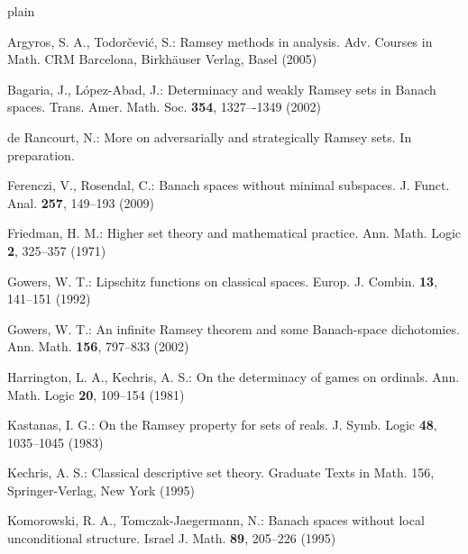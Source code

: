 \documentclass[a4paper,11pt]{article}
\theoremstyle{definition}
\numberwithin{equation}{section}
\begin{document}
\begin{thebibliography}{plain}




\normalsize


Argyros, S. A., Todor\v{c}evi\'c, S.:
Ramsey methods in analysis.
Adv. Courses in Math. CRM Barcelona, Birkh\"auser Verlag, Basel (2005)

Bagaria, J., L\'opez-Abad, J.: 
Determinacy and weakly {R}amsey sets in {B}anach spaces.
Trans. Amer. Math. Soc. \textbf{354}, 1327–-1349 (2002)

de Rancourt, N.:
More on adversarially and strategically {R}amsey sets.
In preparation.

Ferenczi, V., Rosendal, C.: 
{B}anach spaces without minimal subspaces.
J. Funct. Anal. \textbf{257}, 149--193 (2009)

Friedman, H. M.: 
Higher set theory and mathematical practice.
Ann. Math. Logic \textbf{2}, 325--357 (1971)

Gowers, W. T.: 
Lipschitz functions on classical spaces.
Europ. J. Combin. \textbf{13}, 141--151 (1992)

Gowers, W. T.: 
An infinite {R}amsey theorem and some {B}anach-space dichotomies.
Ann. Math. \textbf{156}, 797--833 (2002)

Harrington, L. A., Kechris, A. S.: 
On the determinacy of games on ordinals.
Ann. Math. Logic \textbf{20}, 109--154 (1981)

Kastanas, I. G.: 
On the {R}amsey property for sets of reals.
J. Symb. Logic \textbf{48}, 1035--1045 (1983)

Kechris, A. S.:
Classical descriptive set theory.
Graduate Texts in Math. 156, Springer-Verlag, New York (1995)

Komorowski, R. A., Tomczak-Jaegermann, N.: 
Banach spaces without local unconditional structure.
Israel J. Math. \textbf{89}, 205--226 (1995)


\end{thebibliography}
\end{document}
